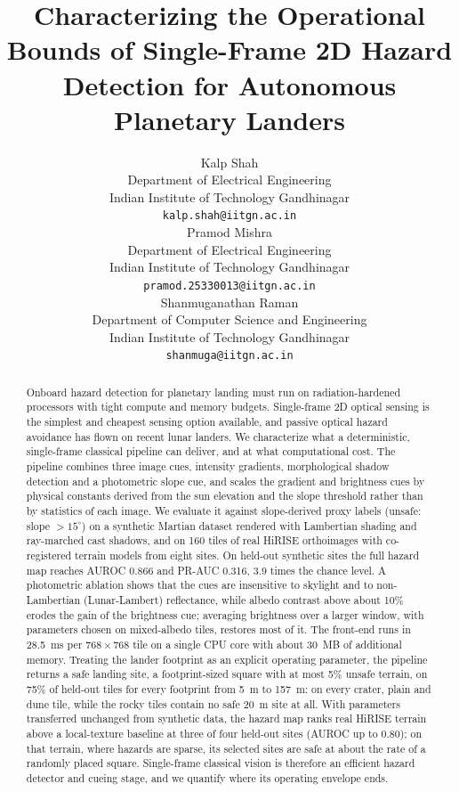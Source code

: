 \documentclass{article}
\title{Characterizing the Operational Bounds of Single-Frame 2D Hazard Detection for Autonomous Planetary Landers}
\author{
  Kalp Shah \\
  Department of Electrical Engineering \\
  Indian Institute of Technology Gandhinagar \\
  \texttt{kalp.shah@iitgn.ac.in} \\
  \And
  Pramod Mishra \\
  Department of Electrical Engineering \\
  Indian Institute of Technology Gandhinagar \\
  \texttt{pramod.25330013@iitgn.ac.in} \\
  \And
  Shanmuganathan Raman \\
  Department of Computer Science and Engineering \\
  Indian Institute of Technology Gandhinagar \\
  \texttt{shanmuga@iitgn.ac.in} \\
}
\begin{document}
\maketitle


\begin{abstract}
Onboard hazard detection for planetary landing must run on radiation-hardened processors with tight compute and memory budgets. Single-frame 2D optical sensing is the simplest and cheapest sensing option available, and passive optical hazard avoidance has flown on recent lunar landers. We characterize what a deterministic, single-frame classical pipeline can deliver, and at what computational cost. The pipeline combines three image cues, intensity gradients, morphological shadow detection and a photometric slope cue, and scales the gradient and brightness cues by physical constants derived from the sun elevation and the slope threshold rather than by statistics of each image. We evaluate it against slope-derived proxy labels (unsafe: slope $>15^\circ$) on a synthetic Martian dataset rendered with Lambertian shading and ray-marched cast shadows, and on 160 tiles of real HiRISE orthoimages with co-registered terrain models from eight sites. On held-out synthetic sites the full hazard map reaches AUROC 0.866 and PR-AUC 0.316, 3.9 times the chance level. A photometric ablation shows that the cues are insensitive to skylight and to non-Lambertian (Lunar-Lambert) reflectance, while albedo contrast above about 10\% erodes the gain of the brightness cue; averaging brightness over a larger window, with parameters chosen on mixed-albedo tiles, restores most of it. The front-end runs in 28.5~ms per $768 \times 768$ tile on a single CPU core with about 30~MB of additional memory. Treating the lander footprint as an explicit operating parameter, the pipeline returns a safe landing site, a footprint-sized square with at most 5\% unsafe terrain, on 75\% of held-out tiles for every footprint from 5~m to 157~m: on every crater, plain and dune tile, while the rocky tiles contain no safe 20~m site at all. With parameters transferred unchanged from synthetic data, the hazard map ranks real HiRISE terrain above a local-texture baseline at three of four held-out sites (AUROC up to 0.80); on that terrain, where hazards are sparse, its selected sites are safe at about the rate of a randomly placed square. Single-frame classical vision is therefore an efficient hazard detector and cueing stage, and we quantify where its operating envelope ends.
\end{abstract}
\end{document}
